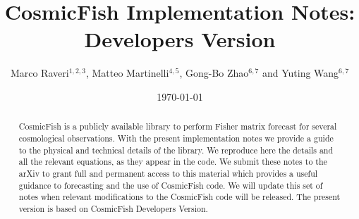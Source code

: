 \documentclass[prd,nofootinbib,showpacs]{revtex4}
\begin{document}
\title{CosmicFish Implementation Notes: Developers Version}

\author{Marco Raveri$^{1,2,3}$, Matteo Martinelli$^{4,5}$, Gong-Bo Zhao$^{6,7}$ and Yuting Wang$^{6,7}$}

\begin{abstract}
CosmicFish is a publicly available library to perform Fisher matrix forecast for several cosmological observations.
With the present implementation notes we provide a guide to the physical and technical details of the library.
We reproduce here the details and all the relevant equations, as they appear in the code.
We submit these notes to the arXiv to grant full and permanent access to this material which provides a useful guidance to forecasting and the use of CosmicFish code.
We will update this set of notes when relevant modifications to the CosmicFish code will be released.
The present version is based on CosmicFish Developers Version.
\end{abstract}

\date{\today}


\maketitle

\tableofcontents

\newpage 
\end{document}
